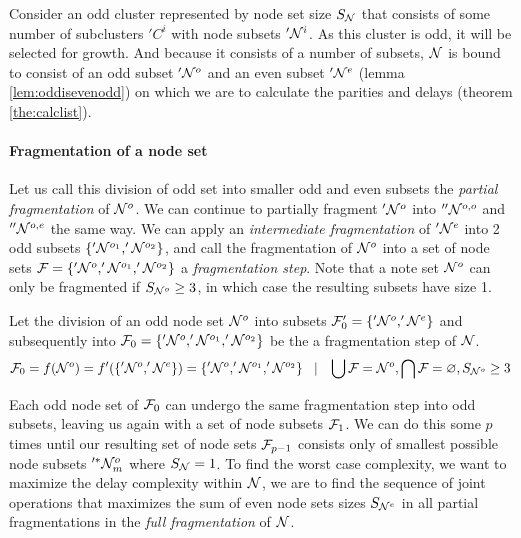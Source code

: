 Consider an odd cluster represented by node set size $S_{\mathcal{N}}$ that consists of some number of subclusters $'C^i$ with node subsets $'\mathcal{N}^i$. As this cluster is odd, it will be selected for growth. And because it consists of a number of subsets, $\mathcal{N}$ is bound to consist of an odd subset $'\mathcal{N}^o$ and an even subset $'\mathcal{N}^e$ (lemma \ref{lem:oddisevenodd}) on which we are to calculate the parities and delays (theorem \ref{the:calclist}).

\paragraph{Fragmentation of a node set}

Let us call this division of odd set into smaller odd and even subsets the \emph{partial fragmentation} of $\mathcal{N}^o$. We can continue to partially fragment $'\mathcal{N}^o$ into $''\mathcal{N}^{o,o}$ and $''\mathcal{N}^{o,e}$ the same way. We can apply an \emph{intermediate fragmentation} of $'\mathcal{N}^e$ into 2 odd subsets $\{'\mathcal{N}^{o_1}, '\mathcal{N}^{o_2}\}$, and call the fragmentation of $\mathcal{N}^o$ into a set of node sets $\mathcal{F} = \{'\mathcal{N}^o, '\mathcal{N}^{o_1}, '\mathcal{N}^{o_2}\}$ a \emph{fragmentation step}. Note that a note set $\mathcal{N}^o$ can only be fragmented if $S_{\mathcal{N}^o} \geq 3$, in which case the resulting subsets have size 1. 

\begin{lemma}\label{lem:partialfrag}
  Let the division of an odd node set $\mathcal{N}^o$ into subsets $\mathcal{F}_0'=\{'\mathcal{N}^o, '\mathcal{N}^e\}$ and subsequently into $\mathcal{F}_0 = \{'\mathcal{N}^o, '\mathcal{N}^{o_1}, '\mathcal{N}^{o_2}\}$ be the a fragmentation step of $\mathcal{N}$.
  \begin{equation}\label{eq:partialfrag}
    \mathcal{F}_0 = f(\mathcal{N}^o) = f'(\{'\mathcal{N}^o, '\mathcal{N}^e\}) = \{'\mathcal{N}^o, '\mathcal{N}^{o_1}, '\mathcal{N}^{o_2}\} \hspace{.3cm} | \hspace{.3cm} \bigcup \mathcal{F} =\mathcal{N}^o, \bigcap \mathcal{F} = \varnothing, S_{\mathcal{N}^o} \geq 3
  \end{equation}
\end{lemma}

Each odd node set of $\mathcal{F}_0$ can undergo the same fragmentation step into odd subsets, leaving us again with a set of node subsets $\mathcal{F}_1$. We can do this some $p$ times until our resulting set of node sets $\mathcal{F}_{p-1}$ consists only of smallest possible node subsets $'^*\mathcal{N}^o_m$ where $S_{\mathcal{N}}=1$. To find the worst case complexity, we want to maximize the delay complexity within $\mathcal{N}$, we are to find the sequence of joint operations that maximizes the sum of even node sets sizes $S_{\mathcal{N}^e}$ in all partial fragmentations in the \emph{full fragmentation} of $\mathcal{N}$.

